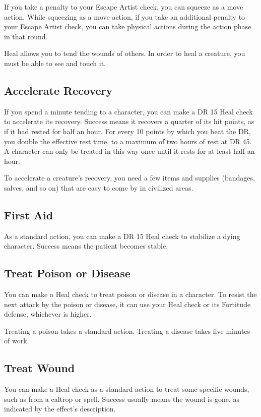         If you take a  penalty to your Escape Artist check, you can squeeze as a move action. While squeezing as a move action, if you take an additional  penalty to your Escape Artist check, you can take physical actions during the action phase in that round.

        Heal allows you to tend the wounds of others. In order to heal a creature, you must be able to see and touch it.

    \subsection{Accelerate Recovery}\label{Accelerate Recovery}
        If you spend a minute tending to a character, you can make a DR 15 Heal check to accelerate its recovery.
        Success means it recovers a quarter of its hit points, as if it had rested for half an hour.
        For every 10 points by which you beat the DR, you double the effective rest time, to a maximum of two hours of rest at DR 45.
        A character can only be treated in this way once until it rests for at least half an hour.

        To accelerate a creature's recovery, you need a few items and supplies (bandages, salves, and so on) that are easy to come by in civilized areas.

    \subsection{First Aid}
        As a standard action, you can make a DR 15 Heal check to stabilize a dying character. Success means the patient becomes stable.

    \subsection{Treat Poison or Disease}
        You can make a Heal check to treat poison or disease in a character.
        To resist the next attack by the poison or disease, it can use your Heal check or its Fortitude defense, whichever is higher.

        Treating a poison takes a standard action. Treating a disease takes five minutes of work.

    \subsection{Treat Wound}
        You can make a Heal check as a standard action to treat some specific wounds, such as from a caltrop or  spell. Success usually means the wound is gone, as indicated by the effect's description.

